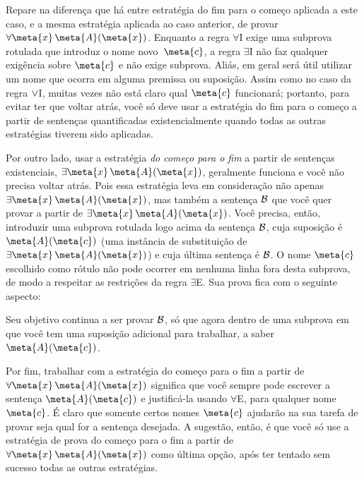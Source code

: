 Repare na diferença que há entre estratégia do fim para o começo aplicada a este caso, e a mesma estratégia aplicada ao caso anterior, de provar $\forall \meta{x}\, \atom{\meta{A}}{\meta{x}}$. Enquanto a regra $\forall$I exige uma subprova rotulada que introduz o nome novo~$\meta{c}$, a regra $\exists$I não faz qualquer exigência sobre $\meta{c}$ e não exige subprova. Aliás, em geral será útil utilizar um nome que ocorra em alguma premissa ou suposição.
Assim como no caso da regra $\vee$I, muitas vezes não está claro qual $\meta{c}$ funcionará; portanto, para evitar ter que voltar atrás, você só deve usar a estratégia do fim para o começo a partir de sentenças quantificadas existencialmente quando todas as outras estratégias tiverem sido aplicadas.

Por outro lado, usar a estratégia \emph{do começo para o fim} a partir de sentenças existenciais,  $\exists \meta{x}\, \atom{\meta{A}}{\meta{x}}$, geralmente funciona e você não precisa voltar atrás. Pois essa estratégia leva em consideração não apenas
 $\exists \meta{x}\, \atom{\meta{A}}{\meta{x}}$, 
mas também a sentença $\mathcal{B}$ que você quer provar a partir de $\exists \meta{x}\, \atom{\meta{A}}{\meta{x}}$.
Você precisa, então, introduzir uma subprova rotulada logo acima da sentença $\mathcal{B}$, cuja suposição é $\atom{\meta{A}}{\meta{c}}$ (uma instância de substituição de $\exists \meta{x}\, \atom{\meta{A}}{\meta{x}}$) e cuja última sentença é $\mathcal{B}$.
O nome $\meta{c}$  escolhido como rótulo não pode ocorrer em nenhuma linha fora desta subprova, de modo a respeitar as restrições da regra $\exists$E. Sua prova fica com o seguinte aspecto:

\begin{fitchproof}
	\ellipsesline
	\ellipsesline
	\open
	\ellipsesline
	\close
\end{fitchproof}
Seu objetivo continua a ser provar $\mathcal{B}$, só que agora dentro de uma subprova em que você tem uma suposição adicional para trabalhar, a saber~$\atom{\meta{A}}{\meta{c}}$.

Por fim, trabalhar com a estratégia do começo para o fim a partir de $\forall \meta{x}\, \atom{\meta{A}}{\meta{x}}$ significa que você sempre pode escrever a sentença $\atom{\meta{A}}{\meta{c}}$ e justificá-la usando $\forall$E, para qualquer nome~$\meta{c}$.  É claro que somente certos nomes $\meta{c}$ ajudarão na sua tarefa de provar seja qual for a sentença desejada. 
A sugestão, então, é que você só use a estratégia de prova do começo para o fim a partir de  $\forall \meta{x}\, \atom{\meta{A}}{\meta{x}}$ como última opção, após ter tentado sem sucesso todas as outras estratégias.

